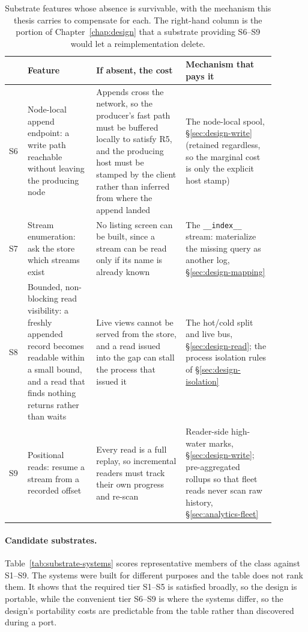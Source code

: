\begin{table}[h]
\centering
\small
\begin{tabular}{@{}p{0.045\linewidth}p{0.235\linewidth}p{0.30\linewidth}p{0.30\linewidth}@{}}
\toprule
& \textbf{Feature} & \textbf{If absent, the cost} & \textbf{Mechanism that pays it} \\
\midrule
S6 & Node-local append endpoint: a write path reachable without leaving the
  producing node &
  Appends cross the network, so the producer's fast path must be buffered
  locally to satisfy R5, and the producing host must be stamped by the
  client rather than inferred from where the append landed &
  The node-local spool, \S\ref{sec:design-write} (retained regardless, so
  the marginal cost is only the explicit host stamp) \\
S7 & Stream enumeration: ask the store which streams exist &
  No listing screen can be built, since a stream can be read only if its
  name is already known &
  The \texttt{\_\_index\_\_} stream: materialize the missing query as
  another log, \S\ref{sec:design-mapping} \\
S8 & Bounded, non-blocking read visibility: a freshly appended record
  becomes readable within a small bound, and a read that finds nothing
  returns rather than waits &
  Live views cannot be served from the store, and a read issued into the
  gap can stall the process that issued it &
  The hot/cold split and live bus, \S\ref{sec:design-read}; the process
  isolation rules of \S\ref{sec:design-isolation} \\
S9 & Positional reads: resume a stream from a recorded offset &
  Every read is a full replay, so incremental readers must track their own
  progress and re-scan &
  Reader-side high-water marks, \S\ref{sec:design-write}; pre-aggregated
  rollups so that fleet reads never scan raw history,
  \S\ref{sec:analytics-fleet} \\
\bottomrule
\end{tabular}
\caption[Convenient substrate features S6--S9 and their compensating
mechanisms]{Substrate features whose absence is survivable, with the
mechanism this thesis carries to compensate for each. The right-hand
column is the portion of Chapter~\ref{chap:design} that a substrate
providing S6--S9 would let a reimplementation delete.}
\label{tab:substrate-optional}
\end{table}

\paragraph{Candidate substrates.} Table~\ref{tab:substrate-systems} scores
representative members of the class against S1--S9. The systems were built
for different purposes and the table does not rank them. It shows that the
required tier S1--S5 is satisfied broadly, so the design is
portable, while the convenient tier S6--S9 is where the systems differ, so
the design's portability costs are predictable from the table rather than
discovered during a port.

